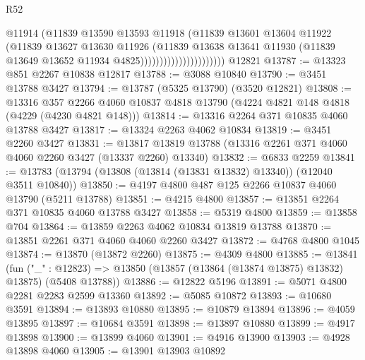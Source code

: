 \begin{lexlean}{R52}
\begin{coremodule}
                                      @11914
                                      (@11839
                                        @13590
                                        @13593
                                        @11918
                                        (@11839
                                          @13601
                                          @13604
                                          @11922
                                          (@11839
                                            @13627
                                            @13630
                                            @11926
                                            (@11839
                                              @13638
                                              @13641
                                              @11930
                                              (@11839
                                                @13649
                                                @13652
                                                @11934
                                                @4825))))))))))))))))))))))
    @12821
@13787 := @13323 @851 @2267 @10838 @12817
@13788 := @3088 @10840
@13790 := @3451 @13788 @3427
@13794 := @13787 (@5325 @13790) (@3520 @12821)
@13808 := @13316
    @357
    @2266
    @4060
    @10837
    @4818
    @13790
    (@4224 @4821 @148 @4818 (@4229 (@4230 @4821 @148)))
@13814 := @13316 @2264 @371 @10835 @4060 @13788 @3427
@13817 := @13324 @2263 @4062 @10834
@13819 := @3451 @2260 @3427
@13831 := @13817 @13819 @13788 (@13316 @2261 @371 @4060 @4060 @2260 @3427 (@13337 @2260) @13340)
@13832 := @6833 @2259
@13841 := @13783 (@13794 (@13808 (@13814 (@13831 @13832) @13340)) (@12040 @3511 @10840))
@13850 := @4197 @4800 @487 @125 @2266 @10837 @4060 @13790 (@5211 @13788)
@13851 := @4215 @4800
@13857 := @13851 @2264 @371 @10835 @4060 @13788 @3427
@13858 := @5319 @4800
@13859 := @13858 @704
@13864 := @13859 @2263 @4062 @10834 @13819 @13788
@13870 := @13851 @2261 @371 @4060 @4060 @2260 @3427
@13872 := @4768 @4800 @1045
@13874 := @13870 (@13872 @2260)
@13875 := @4309 @4800
@13885 := @13841
    (fun ("_" : @12823) => @13850 (@13857 (@13864 (@13874 @13875) @13832) @13875) (@5408 @13788))
@13886 := @12822 @5196
@13891 := @5071 @4800 @2281 @2283 @2599 @13360
@13892 := @5085 @10872
@13893 := @10680 @3591
@13894 := @13893 @10880
@13895 := @10879 @13894
@13896 := @4059 @13895
@13897 := @10684 @3591
@13898 := @13897 @10880
@13899 := @4917 @13898
@13900 := @13899 @4060
@13901 := @4916 @13900
@13903 := @4928 @13898 @4060
@13905 := @13901 @13903 @10892

\end{coremodule}
\end{lexlean}
